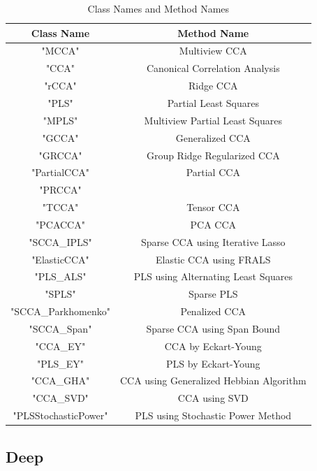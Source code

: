 \begin{table}[ht]
    \centering
    \begin{tabular}{|c|c|}
        \hline
        Class Name & Method Name \\
        \hline
        "MCCA" & Multiview CCA \\
        "CCA" & Canonical Correlation Analysis \\
        "rCCA" & Ridge CCA \\
        "PLS" & Partial Least Squares \\
        "MPLS" & Multiview Partial Least Squares \\
        "GCCA" & Generalized CCA \\
        "GRCCA" & Group Ridge Regularized CCA \\
        "PartialCCA" & Partial CCA \\
        "PRCCA" &  \\
        "TCCA" & Tensor CCA \\
        "PCACCA" & PCA CCA \\
        "SCCA_IPLS" & Sparse CCA using Iterative Lasso \\
        "ElasticCCA" & Elastic CCA using FRALS \\
        "PLS_ALS" & PLS using Alternating Least Squares \\
        "SPLS" & Sparse PLS \\
        "SCCA_Parkhomenko" & Penalized CCA \\
        "SCCA_Span" & Sparse CCA using Span Bound \\
        "CCA_EY" & CCA by Eckart-Young \\
        "PLS_EY" & PLS by Eckart-Young \\
        "CCA_GHA" & CCA using Generalized Hebbian Algorithm \\
        "CCA_SVD" & CCA using SVD \\
        "PLSStochasticPower" & PLS using Stochastic Power Method \\
        \hline
    \end{tabular}
    \caption{Class Names and Method Names}
    \label{tab:class_method}
\end{table}


\subsection{Deep}

